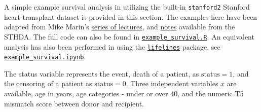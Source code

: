 A simple example survival analysis in \R utilizing the built-in
\texttt{stanford2} Stanford heart transplant dataset is provided in this section.
The examples here have been adapted from Mike Marin's
\href{https://www.youtube.com/playlist?list=PLqzoL9-eJTNDdnKvep_YHIwk2AMqHhuJ0}{series of lectures},
and \href{http://www.sthda.com/english/wiki/cox-model-assumptions}{notes} available from the STHDA.
The full \R code can also be found in
\href{https://github.com/mepland/data_science_notes/blob/main/sections/appendixes/additional/example_survival.R}{\texttt{example\_survival.R}}.
An equivalent analysis has also been performed in \python using the
\href{https://lifelines.readthedocs.io/en/latest}{\texttt{lifelines}} package,
see
\href{https://github.com/mepland/data_science_notes/blob/main/sections/appendixes/additional/example_survival.ipynb}{\texttt{example\_survival.ipynb}}.

The status variable represents the event, death of a patient, as $\text{status}=1$,
and the censoring of a patient as $\text{status}=0$.
Three independent variables $x$ are available,
age in years,
age categories - under or over 40,
and the numeric T5 mismatch score between donor and recipient.

